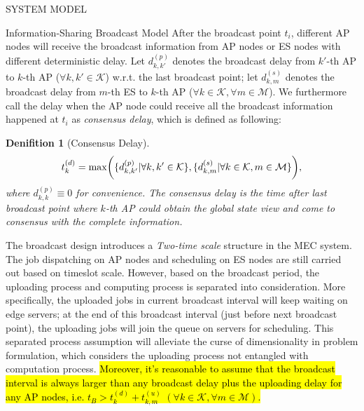 \documentclass[10pt, conference, letterpaper]{IEEEtran}
\newtheorem{definition}{Denifition}
\DeclarePairedDelimiter{\set}{\{}{\}}
\DeclarePairedDelimiter{\Paren}{\bigg(}{\bigg)}
\newcommand{\apSet}{\mathcal{K}}
\newcommand{\esSet}{\mathcal{M}}
\begin{document}
\begin{section}{SYSTEM MODEL}
\begin{subsection}{Information-Sharing Broadcast Model}
            After the broadcast point $t_i$, different AP nodes will receive the broadcast information from AP nodes or ES nodes with different deterministic delay.
            Let $d^{(p)}_{k,k'}$ denotes the broadcast delay from $k'$-th AP to $k$-th AP ($\forall k,k'\in\apSet$) w.r.t. the last broadcast point; let $d^{(s)}_{k,m}$ denotes the broadcast delay from $m$-th ES to $k$-th AP ($\forall k\in\apSet,\forall m\in\esSet$). We furthermore call the delay when the AP node could receive all the broadcast information happened at $t_i$ as \emph{consensus delay}, which is defined as following:
            \begin{definition}[Consensus Delay]
                \begin{align}
                    t^{(d)}_k = \max \Paren{\set{d^{(p)}_{k,k'}|\forall k,k'\in\apSet}, \set{d^{(s)}_{k,m}|\forall k\in\apSet,m\in\esSet}},
                \end{align}
                where $d^{(p)}_{k,k} \equiv 0$ for convenience. The consensus delay is the time after last broadcast point where $k$-th AP could obtain the global state view and come to consensus with the complete information.
            \end{definition}
                        
            The broadcast design introduces a \emph{Two-time scale} structure in the MEC system. The job dispatching on AP nodes and scheduling on ES nodes are still carried out based on timeslot scale. However, based on the broadcast period, the uploading process and computing process is separated into consideration.
            More specifically, the uploaded jobs in current broadcast interval will keep waiting on edge servers; at the end of this broadcast interval (just before next broadcast point), the uploading jobs will join the queue on servers for scheduling. This separated process assumption will alleviate the curse of dimensionality in problem formulation, which considers the uploading process not entangled with computation process.
            \hl{Moreover, it's reasonable to assume that the broadcast interval is always larger than any broadcast delay plus the uploading delay for any AP nodes, i.e. $t_B > t^{(d)}_{k} + t^{(u)}_{k,m}$ $(\forall k\in\apSet, \forall m\in\esSet)$.}
            

\end{subsection}
\end{section}
\end{document}
